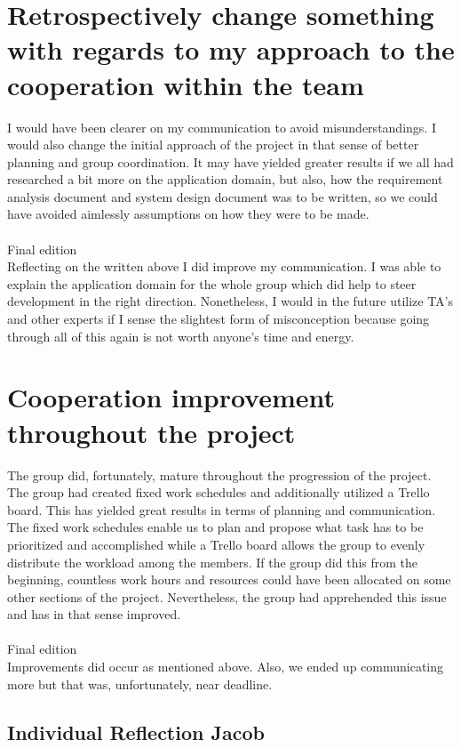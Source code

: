\section{Retrospectively change something with regards to my approach to the cooperation within the team}
I would have been clearer on my communication to avoid misunderstandings. I would also change the initial approach of the project in that sense of better planning and group coordination. It may have yielded greater results if we all had researched a bit more on the application domain, but also, how the requirement analysis document and system design document was to be written, so we could have avoided aimlessly assumptions on how they were to be made.\\\\
Final edition \\
Reflecting on the written above I did improve my communication. I was able to explain the application domain for the whole group which did help to steer development 
in the right direction. Nonetheless, I would in the future utilize TA's and other experts if I sense the slightest form of misconception because going through all of this again is not worth anyone's time and energy.

\section{Cooperation improvement throughout the project}
The group did, fortunately, mature throughout the progression of the project. The group had created ﬁxed work schedules and additionally utilized a Trello board. This has yielded great results in terms of planning and communication. The ﬁxed work schedules enable us to plan and propose what task has to be prioritized and accomplished while a Trello board allows the group to evenly distribute the workload among the members. If the group did this from the beginning, countless work hours and resources could have been allocated on some other sections of the project. Nevertheless, the group had apprehended this issue and has in that sense improved.\\\\ 
Final edition \\
Improvements did occur as mentioned above. Also, we ended up communicating more but that was, unfortunately, near deadline.


\pagebreak
\subsection{Individual Reflection Jacob}

